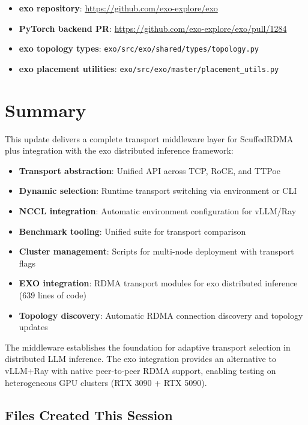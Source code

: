 \documentclass[10pt,letterpaper]{article}
\begin{document}
\begin{itemize}[noitemsep]
    \item \textbf{exo repository}: \url{https://github.com/exo-explore/exo}
    \item \textbf{PyTorch backend PR}: \url{https://github.com/exo-explore/exo/pull/1284}
    \item \textbf{exo topology types}: \texttt{exo/src/exo/shared/types/topology.py}
    \item \textbf{exo placement utilities}: \texttt{exo/src/exo/master/placement\_utils.py}
\end{itemize}

\section{Summary}

This update delivers a complete transport middleware layer for ScuffedRDMA plus integration with the exo distributed inference framework:

\begin{itemize}[noitemsep]
    \item \textbf{Transport abstraction}: Unified API across TCP, RoCE, and TTPoe
    \item \textbf{Dynamic selection}: Runtime transport switching via environment or CLI
    \item \textbf{NCCL integration}: Automatic environment configuration for vLLM/Ray
    \item \textbf{Benchmark tooling}: Unified suite for transport comparison
    \item \textbf{Cluster management}: Scripts for multi-node deployment with transport flags
    \item \textbf{EXO integration}: RDMA transport modules for exo distributed inference (639 lines of code)
    \item \textbf{Topology discovery}: Automatic RDMA connection discovery and topology updates
\end{itemize}

The middleware establishes the foundation for adaptive transport selection in distributed LLM inference. The exo integration provides an alternative to vLLM+Ray with native peer-to-peer RDMA support, enabling testing on heterogeneous GPU clusters (RTX 3090 + RTX 5090).

\subsection{Files Created This Session}
\end{document}
